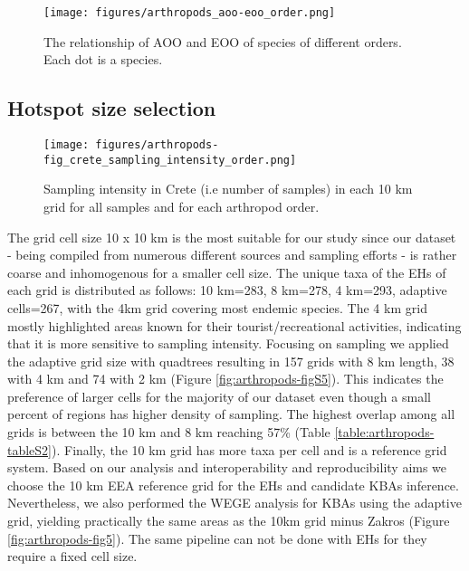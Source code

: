    \begin{figure}[htp!]
      \centering
      \texttt{[image: figures/arthropods\_aoo-eoo\_order.png]}
      \caption[AOO, EOO relationship per order]{The relationship of AOO and EOO of species of different orders. Each dot is a species. }
      \label{fig:arthropods-eoo-aoo}
   \end{figure}


    \subsection{Hotspot size selection}
    \label{subsec:arthropods-grids}


   \begin{figure}[htp!]
      \centering
      \texttt{[image: figures/arthropods-fig\_crete\_sampling\_intensity\_order.png]}
      \caption[Sampling intensity]{Sampling intensity in Crete (i.e number of samples) in each 10 km grid for all samples and for each arthropod order.}
      \label{fig:arthropods-sampling-intesity}
   \end{figure}




The grid cell size 10 x 10 km is the most suitable for our study since our
dataset - being compiled from numerous different sources and sampling efforts -
is rather coarse and inhomogenous for a smaller cell size.
The unique taxa of the EHs of each grid is distributed as follows: 10 km=283,
8 km=278, 4 km=293, adaptive cells=267, with the 4km grid covering most endemic
species. The 4 km grid mostly highlighted areas known for their tourist/recreational activities,
indicating that it is more sensitive to sampling intensity.
Focusing on sampling we applied the adaptive grid size with quadtrees resulting
in 157 grids with 8 km length, 38 with 4 km and 74 with 2 km (Figure \ref{fig:arthropods-figS5}).
This indicates the preference of larger cells for the majority of our dataset
even though a small percent of regions has higher density of sampling.
The highest overlap among all grids is between the 10 km and 8 km reaching
57\% (Table \ref{table:arthropods-tableS2}). Finally, the 10 km grid has more taxa
per cell and is a reference grid system.
Based on our analysis and interoperability and reproducibility aims we choose
the 10 km EEA reference grid for the EHs and candidate KBAs inference.
Nevertheless, we also performed the WEGE analysis for KBAs using the adaptive
grid, yielding practically the same areas as the 10km grid minus Zakros (Figure \ref{fig:arthropods-fig5}).
The same pipeline can not be done with EHs for they require a fixed cell size.


